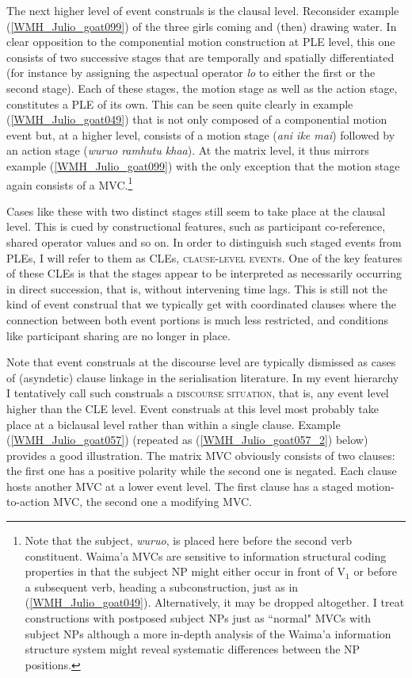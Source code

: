 The next higher level of event construals is the clausal level. Reconsider example (\ref{WMH_Julio_goat099}) of the three girls coming and (then) drawing water. In clear opposition to the componential motion construction at PLE level, this one consists of two successive stages that are temporally and spatially differentiated (for instance by assigning the aspectual operator \textit{lo} to either the first or the second stage). Each of these stages, the motion stage as well as the action stage, constitutes a PLE of its own. This can be seen quite clearly in example (\ref{WMH_Julio_goat049}) that is not only composed of a componential motion event but, at a higher level, consists of a motion stage (\textit{ani ike mai}) followed by an action stage (\textit{wuruo ramhutu khaa}). At the matrix level, it thus mirrors example (\ref{WMH_Julio_goat099}) with the only exception that the motion stage again consists of a MVC.\footnote{Note that the subject, \textit{wuruo}, is placed here before the second verb constituent. Waima'a MVCs are sensitive to information structural coding properties in that the subject NP might either occur in front of V$_1$ or before a subsequent verb, heading a subconstruction, just as in (\ref{WMH_Julio_goat049}). Alternatively, it may be dropped altogether. I treat constructions with postposed subject NPs just as ``normal" MVCs with subject NPs although a more in-depth analysis of the Waima'a information structure system might reveal systematic differences between the NP positions.}

Cases like these with two distinct stages still seem to take place at the clausal level. This is cued by constructional features, such as participant co-reference, shared operator values and so on. In order to distinguish such staged events from PLEs, I will refer to them as CLEs, \textsc{clause-level event}s. One of the key features of these CLEs is that the stages appear to be interpreted as necessarily occurring in direct succession, that is, without intervening time lags. This is still not the kind of event construal that we typically get with coordinated clauses where the connection between both event portions is much less restricted, and conditions like participant sharing are no longer in place. 

Note that event construals at the discourse level are typically dismissed as cases of (asyndetic) clause linkage in the serialisation literature. In my event hierarchy I tentatively call such construals a \textsc{discourse situation}, that is, any event level higher than the CLE level. Event construals at this level most probably take place at a biclausal level rather than within a single clause. Example (\ref{WMH_Julio_goat057}) (repeated as (\ref{WMH_Julio_goat057_2}) below) provides a good illustration. The matrix MVC obviously consists of two clauses: the first one has a positive polarity while the second one is negated. Each clause hosts another MVC at a lower event level. The first clause has a staged motion-to-action MVC, the second one a modifying MVC.

